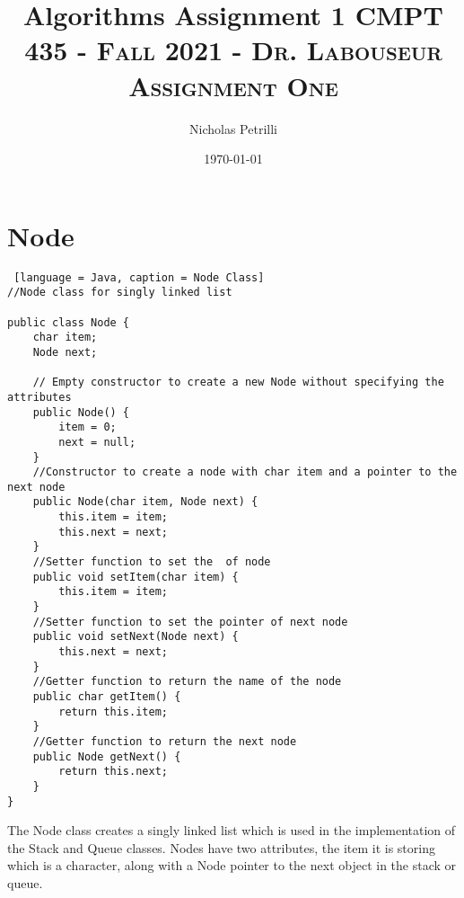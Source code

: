 \documentclass{article}
\title{Algorithms Assignment 1}
\author{Nicholas Petrilli }
\title{	
   \normalfont \normalsize 
   \textsc{CMPT 435 - Fall 2021 - Dr. Labouseur} \\[10pt] %
   \textsc{Assignment One}
}
\date{\today}
\begin{document}
\lstset{
  numbers=left,
  firstnumber=1,
  numberfirstline=true
}
\maketitle

\section{Node}

\begin{lstlisting} [language = Java, caption = Node Class]
//Node class for singly linked list

public class Node {
    char item;
    Node next;

    // Empty constructor to create a new Node without specifying the attributes
    public Node() {
        item = 0;
        next = null;
    }
    //Constructor to create a node with char item and a pointer to the next node
    public Node(char item, Node next) {
        this.item = item;
        this.next = next;
    }
    //Setter function to set the  of node
    public void setItem(char item) {
        this.item = item;
    }
    //Setter function to set the pointer of next node
    public void setNext(Node next) {
        this.next = next;
    }
    //Getter function to return the name of the node
    public char getItem() {
        return this.item;
    }
    //Getter function to return the next node
    public Node getNext() {
        return this.next;
    }
}
\end{lstlisting}
\noindent
The Node class creates a singly linked list which is used in the implementation of the Stack and Queue classes. Nodes have two attributes, the item it is storing which is a character, along with a Node pointer to the next object in the stack or queue.  
\end{document}
